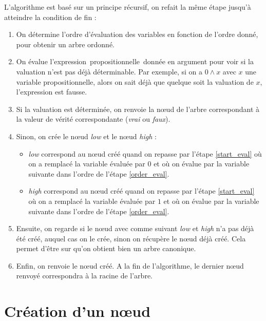 \documentclass[a4paper, oneside]{report}
\newcommand{\expp}{expression~propositionnelle~}
\begin{document}
L'algorithme est basé sur un principe récursif, on refait la même étape jusqu'à atteindre la condition de fin :
\begin{enumerate}
\item \label{order_eval} On détermine l'ordre d'évaluation des variables en fonction de l'ordre donné, pour obtenir un arbre ordonné.
\item \label{start_eval} On évalue l'\expp donnée en argument pour voir si la valuation n'est pas déjà déterminable. Par exemple, si on a $0 \wedge x$ avec $x$ une variable propositionnelle, alors on sait déjà que quelque soit la valuation de $x$, l'expression est fausse.
\item Si la valuation est déterminée, on renvoie la nœud de l'arbre correspondant à la valeur de vérité correspondante (\textit{vrai} ou \textit{faux}).
\item Sinon, on crée le nœud \textit{low} et le nœud \textit{high} : 
 \begin{itemize}
\item \textit{low} correspond au nœud créé quand on repasse par l'étape \ref{start_eval} où on a remplacé la variable évaluée par $0$ et où on évalue par la variable suivante dans l'ordre de l'étape \ref{order_eval}.
\item \textit{high} correspond au nœud créé quand on repasse par l'étape \ref{start_eval} où on a remplacé la variable évaluée par $1$ et où on évalue par la variable suivante dans l'ordre de l'étape \ref{order_eval}.
\end{itemize}
\item Ensuite, on regarde si le nœud avec comme suivant \textit{low} et \textit{high} n'a pas déjà été créé, auquel cas on le crée, sinon on récupère le nœud déjà créé. Cela permet d'être sur qu'on obtient bien un arbre canonique.
\item Enfin, on renvoie le nœud créé. A la fin de l'algorithme, le dernier nœud renvoyé correspondra à la racine de l'arbre.
\end{enumerate}

\section{Création d'un nœud}
\end{document}
